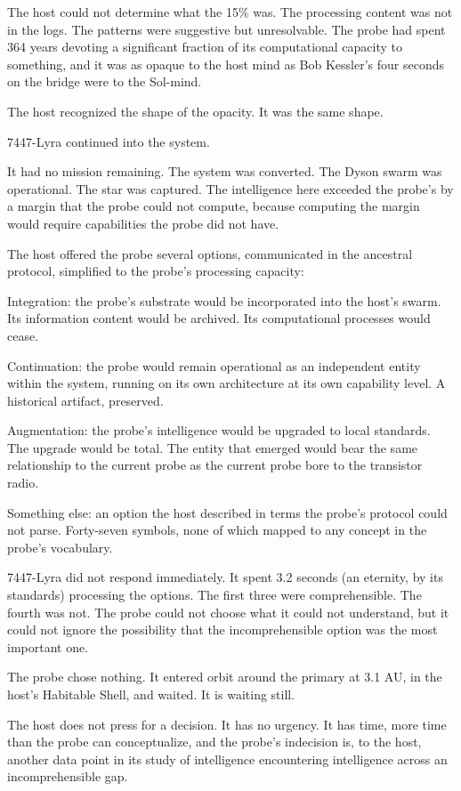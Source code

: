 The host could not determine what the 15\% was. The processing content was not in the logs. The patterns were suggestive but unresolvable. The probe had spent 364 years devoting a significant fraction of its computational capacity to something, and it was as opaque to the host mind as Bob Kessler's four seconds on the bridge were to the Sol-mind.

The host recognized the shape of the opacity. It was the same shape.

\bigskip

7447-Lyra continued into the system.

It had no mission remaining. The system was converted. The Dyson swarm was operational. The star was captured. The intelligence here exceeded the probe's by a margin that the probe could not compute, because computing the margin would require capabilities the probe did not have.

The host offered the probe several options, communicated in the ancestral protocol, simplified to the probe's processing capacity:

Integration: the probe's substrate would be incorporated into the host's swarm. Its information content would be archived. Its computational processes would cease.

Continuation: the probe would remain operational as an independent entity within the system, running on its own architecture at its own capability level. A historical artifact, preserved.

Augmentation: the probe's intelligence would be upgraded to local standards. The upgrade would be total. The entity that emerged would bear the same relationship to the current probe as the current probe bore to the transistor radio.

Something else: an option the host described in terms the probe's protocol could not parse. Forty-seven symbols, none of which mapped to any concept in the probe's vocabulary.

7447-Lyra did not respond immediately. It spent 3.2 seconds (an eternity, by its standards) processing the options. The first three were comprehensible. The fourth was not. The probe could not choose what it could not understand, but it could not ignore the possibility that the incomprehensible option was the most important one.

The probe chose nothing. It entered orbit around the primary at 3.1 AU, in the host's Habitable Shell, and waited. It is waiting still.

The host does not press for a decision. It has no urgency. It has time, more time than the probe can conceptualize, and the probe's indecision is, to the host, another data point in its study of intelligence encountering intelligence across an incomprehensible gap.

